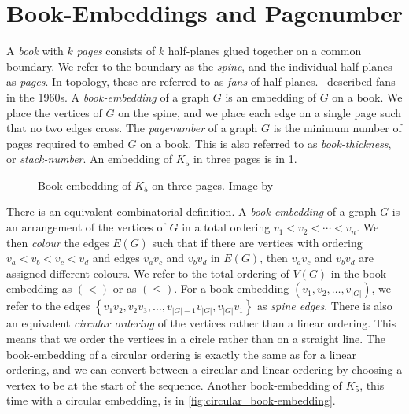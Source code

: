 \section{Book-Embeddings and Pagenumber}\label{sec:Book Embedding}
A \textit{book} with \(k\) \textit{pages} consists of \(k\) half-planes glued together on a common boundary. We refer to the boundary as the \textit{spine}, and the individual half-planes as \textit{pages}. In topology, these are referred to as \textit{fans} of half-planes.\ \textcite{persingerSubsetsNbooksE31966,atneosenOnedimensionalNleavedContinua1972} described fans in the 1960s.
A \textit{book-embedding} of a graph \(G\) is an embedding of \(G\) on a book. We place the vertices of \(G\) on the spine, and we place each edge on a single page such that no two edges cross. 
The \textit{pagenumber} of a graph \(G\) is the minimum number of pages required to embed \(G\) on a book. This is also referred to as \textit{book-thickness}, or \textit{stack-number}. An embedding of $K_5$ in three pages is in \cref{fig:book-embedding}.

\begin{figure}[h!]
	\centering
	
	\caption[Three-page book-embedding of $K_5$]{Book-embedding of $K_5$ on three pages. Image by \textcite{eppsteinBookEmbedding2014}}\label{fig:book-embedding}
\end{figure}

There is an equivalent combinatorial definition. A \textit{book embedding} of a graph \(G\) is an arrangement of the vertices of \(G\) in a total ordering \(v_1 < v_2 < \cdots < v_n\). We then \textit{colour} the edges \(E(G)\) such that if there are vertices with ordering \(v_a < v_b < v_c < v_d\) and edges \(v_a v_c\) and \(v_b v_d\) in $E(G)$, then $v_a v_c$ and $v_b v_d$ are assigned different colours.
We refer to the total ordering of \(V(G)\) in the book embedding as \((<)\) or as \((\leq)\). For a book-embedding \((v_1, v_2, \ldots, v_{|G|})\), we refer to the edges \( \left\{ v_1 v_2, v_2 v_3, \ldots, v_{|G| - 1}v_{|G|}, v_{|G|}v_{1} \right\} \) as \textit{spine edges}.
There is also an equivalent \textit{circular ordering} of the vertices rather than a linear ordering. This means that we order the vertices in a circle rather than on a straight line. The book-embedding of a circular ordering is exactly the same as for a linear ordering, and we can convert between a circular and linear ordering by choosing a vertex to be at the start of the sequence. Another book-embedding of $K_5$, this time with a circular embedding, is in \cref{fig:circular_book-embedding}.

